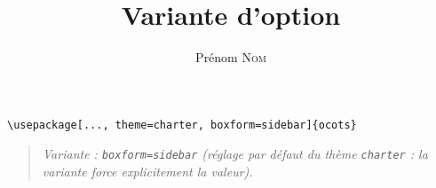 \documentclass[11pt]{ocots-book}
\title{Variante d'option}
\author{Prénom \textsc{Nom}}
\newcommand{\ocotsvariantnote}[1]{\begin{quote}\itshape Variante : #1\end{quote}}
\begin{document}
\maketitle

\begin{lstlisting}
\usepackage[..., theme=charter, boxform=sidebar]{ocots}
\end{lstlisting}
\ocotsvariantnote{\texttt{boxform=sidebar} (r\'eglage par d\'efaut du th\`eme \texttt{charter} : la variante force explicitement la valeur).}

\end{document}
